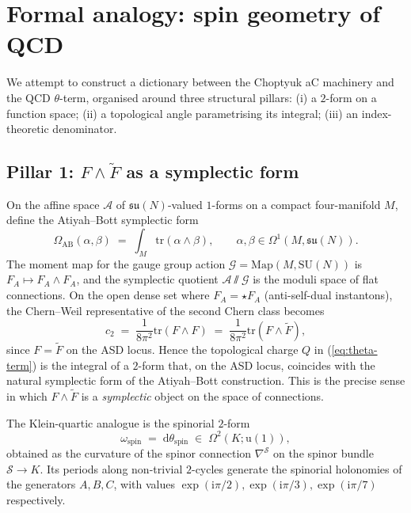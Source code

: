 \documentclass[11pt,a4paper]{article}
\newcommand{\aC}{a\text{-}C}
\newcommand{\SU}{\mathrm{SU}}
\providecommand{\dd}{}
\renewcommand{\dd}{\mathrm{d}}
\providecommand{\ii}{}
\renewcommand{\ii}{\mathrm{i}}
\renewcommand{\tr}{\mathrm{tr}}
\theoremstyle{plain}
\theoremstyle{definition}
\theoremstyle{remark}
\begin{document}
\section{Formal analogy: spin geometry of QCD}\label{sec:formal-analogy}

We attempt to construct a dictionary between the Choptyuk \aC{}
machinery and the QCD $\theta$-term, organised around three structural
pillars: (i) a $2$-form on a function space; (ii) a topological angle
parametrising its integral; (iii) an index-theoretic denominator.

\subsection{Pillar 1: $F\wedge\tilde F$ as a symplectic form}\label{ssec:pillar1}

On the affine space $\mathcal{A}$ of $\mathfrak{su}(N)$-valued
$1$-forms on a compact four-manifold $M$, define the Atiyah--Bott
symplectic form~\cite{atiyahbott1983}
\begin{equation}\label{eq:atiyah-bott}
  \Omega_{\mathrm{AB}}(\alpha,\beta) \;=\; \int_M \tr(\alpha\wedge\beta),
  \qquad \alpha,\beta\in\Omega^1(M,\mathfrak{su}(N)).
\end{equation}
The moment map for the gauge group action $\mathcal{G}=\mathrm{Map}(M,\SU(N))$
is $F_A\mapsto F_A\wedge F_A$, and the symplectic quotient
$\mathcal{A}\sslash \mathcal{G}$ is the moduli space of flat connections.
On the open dense set where $F_A = \star F_A$ (anti-self-dual instantons),
the Chern--Weil representative of the second Chern class becomes
\begin{equation}
  c_2 \;=\; \frac{1}{8\pi^2}\tr(F\wedge F) \;=\; \frac{1}{8\pi^2}\tr(F\wedge\tilde F),
\end{equation}
since $F = \tilde F$ on the ASD locus.  Hence the topological charge
$Q$ in (\ref{eq:theta-term}) is the integral of a $2$-form that, on the
ASD locus, coincides with the natural symplectic form of the
Atiyah--Bott construction.  This is the precise sense in which
$F\wedge\tilde F$ is a \emph{symplectic} object on the space of
connections.

The Klein-quartic analogue is the spinorial $2$-form
\begin{equation}
  \omega_{\mathrm{spin}} \;=\; \dd\theta_{\mathrm{spin}}
  \;\in\; \Omega^2(K;\mathrm{u}(1)),
\end{equation}
obtained as the curvature of the spinor connection $\nabla^{\mathcal{S}}$
on the spinor bundle $\mathcal{S}\to K$.  Its periods along non-trivial
$2$-cycles generate the spinorial holonomies of the generators
$A, B, C$, with values $\exp(\ii\pi/2), \exp(\ii\pi/3), \exp(\ii\pi/7)$
respectively.
\end{document}
